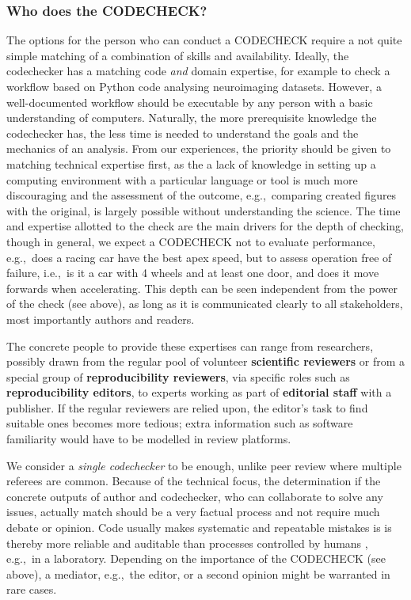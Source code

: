 \documentclass[12pt]{article}
\begin{document}
\subsubsection*{Who does the CODECHECK?}\label{who-does-the-codecheck}

The options for the person who can conduct a CODECHECK require a not quite
simple matching of a combination of skills and availability. Ideally, the
codechecker has a matching code \emph{and} domain expertise, for example to
check a workflow based on Python code analysing neuroimaging datasets. However,
a well-documented workflow should be executable by any person with a basic
understanding of computers. Naturally, the more prerequisite knowledge the
codechecker has, the less time is needed to understand the goals and 
the mechanics of an analysis. From our experiences, the priority should be
given to matching technical expertise first, as the a lack of knowledge in
setting  up a computing environment with a particular language or tool is 
much more discouraging and the assessment of the outcome, e.g.,~comparing
created figures with the original, is largely possible without 
understanding the science.
The time and expertise allotted to the check
are the main drivers for the depth of checking, though in general, we 
expect a CODECHECK not to evaluate performance, e.g.,~does a racing car
have the best apex speed, but to assess operation free of failure, i.e.,~is
it a car with 4 wheels and at least one door, and does it move forwards
when accelerating. This depth can be seen independent from the power of
the check (see above), as long as it is communicated clearly to all
stakeholders, most importantly authors and readers.

The concrete people to provide these expertises can range from researchers,
possibly drawn from the regular pool of volunteer
\textbf{scientific reviewers} or from a special group of
\textbf{reproducibility reviewers}, via specific roles
such as \textbf{reproducibility editors}, to experts working as part of
\textbf{editorial staff} with a publisher. If the regular reviewers
are relied upon, the editor's task to find suitable ones becomes more
tedious; extra information such as software familiarity would have to be
modelled in review platforms.

We consider a \emph{single codechecker} to be enough, unlike peer review where
multiple referees are common. Because of the technical focus, the 
determination if the concrete outputs of author and codechecker, who can
collaborate to solve any issues, actually match should be a very factual 
process and not
require much debate or opinion. Code usually makes systematic and repeatable
mistakes is is thereby more reliable and auditable than processes controlled
by humans \cite{tibav:42484}, e.g.,~in a laboratory.
Depending on the importance of the CODECHECK
(see above), a mediator, e.g.,~the editor, or a
second opinion might be warranted in rare cases.
\end{document}
